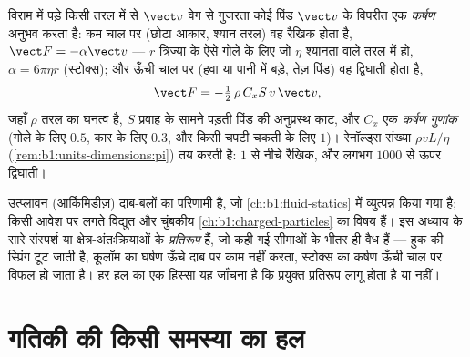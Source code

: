 \begin{proposition}[तरल घर्षण]\label{prop:b1:newton-dynamics:drag}
विराम में पड़े किसी तरल में से $\vect v$ वेग से गुजरता कोई पिंड $\vect v$ के
विपरीत एक \emph{कर्षण} अनुभव करता है: कम चाल पर (छोटा आकार, श्यान तरल) वह
रैखिक होता है, $\vect F = -\alpha\vect v$ --- $r$ त्रिज्या के ऐसे गोले के
लिए जो $\eta$ श्यानता वाले तरल में हो, $\alpha = 6\pi\eta r$ (स्टोक्स); और
ऊँची चाल पर (हवा या पानी में बड़े, तेज़ पिंड) वह द्विघाती होता है,
\[
\vect F = -\tfrac12\,\rho\,C_xS\,v\,\vect v ,
\]
जहाँ $\rho$ तरल का घनत्व है, $S$ प्रवाह के सामने पड़ती पिंड की अनुप्रस्थ
काट, और $C_x$ एक  \emph{कर्षण गुणांक} (गोले के लिए $0.5$, कार के
लिए $0.3$, और किसी चपटी चकती के लिए $1$)। रेनॉल्ड्स संख्या
$\rho vL/\eta$ (\cref{rem:b1:units-dimensions:pi}) तय करती है: $1$ से नीचे
रैखिक, और लगभग $1000$ से ऊपर द्विघाती।
\end{proposition}
\admitted

\begin{remark}[अन्य बल]\label{rem:b1:newton-dynamics:others}
उत्प्लावन (आर्किमिडीज़) दाब-बलों का परिणामी है, जो
\cref{ch:b1:fluid-statics} में व्युत्पन्न किया गया है; किसी आवेश पर लगते
विद्युत और चुंबकीय  \cref{ch:b1:charged-particles} का विषय हैं। इस अध्याय
के सारे  संस्पर्श या क्षेत्र-अंतःक्रियाओं के \emph{प्रतिरूप} हैं, जो कही
गई सीमाओं के भीतर ही वैध हैं --- हुक की स्प्रिंग टूट जाती है, कूलॉम का
घर्षण ऊँचे दाब पर काम नहीं करता, स्टोक्स का कर्षण ऊँची चाल पर विफल हो जाता
है। हर हल का एक हिस्सा यह जाँचना है कि प्रयुक्त प्रतिरूप लागू होता है या नहीं।
\end{remark}

\section{गतिकी की किसी समस्या का हल}

